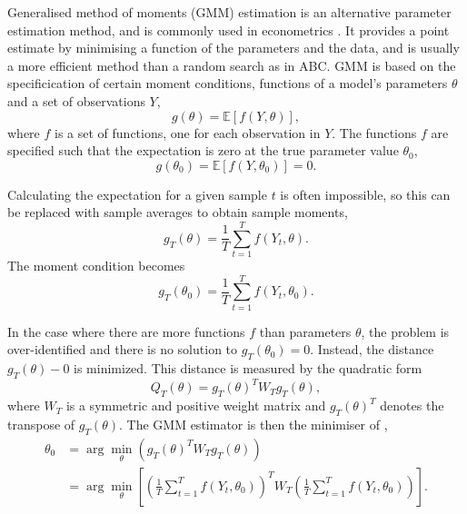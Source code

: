 Generalised method of moments (GMM) estimation is an alternative parameter estimation method, and is commonly used in econometrics \cite{Hansen1982, Hall1993}. It provides a point estimate by minimising a function of the parameters and the data, and is usually a more efficient method than a random search as in ABC. GMM is based on the specificication of certain moment conditions, functions of a model's parameters $\theta$ and a set of observations $Y$,
%
\begin{equation}
g(\theta) = \mathbb{E}[f(Y, \theta)] ,
\label{eqn:moment}
\end{equation}
%
where $f$ is a set of functions, one for each observation in $Y$. The functions $f$ are specified such that the expectation is zero at the true parameter value $\theta_0$,
%
\begin{equation}
g(\theta_0) = \mathbb{E}[f(Y, \theta_0)] = 0.
\label{eqn:moment}
\end{equation}

Calculating the expectation for a given sample $t$ is often impossible, so this can be replaced with sample averages to obtain sample moments,
%
\begin{equation}
g_T(\theta) = \frac{1}{T} \sum_{t=1}^{T} f(Y_t, \theta) .
\end{equation}
%
The moment condition becomes
%
\begin{equation}
g_T(\theta_0) = \frac{1}{T} \sum_{t=1}^T f(Y_t, \theta_0) .
\end{equation}

In the case where there are more functions $f$ than parameters $\theta$, the problem is over-identified and there is no solution to $g_T(\theta_0) = 0$. Instead, the distance $g_T(\theta) - 0$ is minimized. This distance is measured by the quadratic form
%
\begin{equation}
Q_T(\theta) = g_T(\theta)^T W_T g_T(\theta),
\label{eqn:GMM_distance}
\end{equation}
%
where $W_T$ is a symmetric and positive weight matrix and $g_T(\theta)^T$ denotes the transpose of $g_T(\theta)$. The GMM estimator is then the minimiser of ,
%
\begin{equation}
\begin{split}
\theta_0 &= \arg \min_{\theta}(g_T(\theta)^T W_Tg_T(\theta)) \\
         &= \arg \min_{\theta} \left[ \left( \frac{1}{T}\sum_{t=1}^T f(Y_t, \theta_0) \right)^T W_T \left( \frac{1}{T}\sum_{t=1}^T f(Y_t, \theta_0) \right) \right] .
\end{split}
\label{eqn:GMM}
\end{equation}

